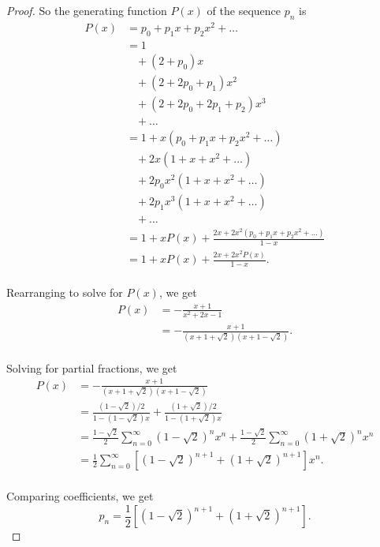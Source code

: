 \documentclass{article}
\begin{document}
\begin{enumerate}[label={\bf Q\arabic*:}]
\begin{proof}
      So the generating function $P(x)$ of the sequence $p_n$ is
      \begin{align*}
        P(x) &=p_0 +p_1x +p_2x^2+\ldots\\
          &=1\\
          &\;\;\;+(2+p_0)x\\
          &\;\;\;+(2+2p_0+p_1)x^2\\
          &\;\;\;+(2+2p_0+2p_1+p_2)x^3\\
          &\;\;\;+\ldots\\
        &=1+x(p_0+p_1x+p_2x^2+\ldots)\\
          &\;\;\;+2x(1+x+x^2+\ldots)\\
          &\;\;\;+2p_0x^2(1+x+x^2+\ldots)\\
          &\;\;\;+2p_1x^3(1+x+x^2+\ldots)\\
          &\;\;\;+\ldots\\
        &=1+xP(x) +\frac{2x+2x^2(p_0+p_1x+p_2x^2+\ldots)}{1-x}\\
        &=1+xP(x) +\frac{2x+2x^2P(x)}{1-x}.\\
      \end{align*}

      Rearranging to solve for $P(x)$, we get
      \begin{align*}
        P(x) &=-\frac{x+1}{x^2+2x-1}\\
        &=-\frac{x+1}{(x+1+\sqrt{2})(x+1-\sqrt{2})}.\\
      \end{align*}

      Solving for partial fractions, we get
      \begin{align*}
        P(x) &=-\frac{x+1}{(x+1+\sqrt{2})(x+1-\sqrt{2})}\\
        &=\frac{(1-\sqrt{2})/2}{1-(1-\sqrt{2})x}
          +\frac{(1+\sqrt{2})/2}{1-(1+\sqrt{2})x}\\
        &=\frac{1-\sqrt{2}}{2} \sum_{n=0}^\infty
          \left(1-\sqrt{2}\right)^nx^n +\frac{1-\sqrt{2}}{2}
          \sum_{n=0}^\infty \left(1+\sqrt{2}\right)^nx^n\\
        &=\frac{1}{2} \sum_{n=0}^\infty \left[\left(1-\sqrt{2}\right)^{n+1}
        +\left(1+\sqrt{2}\right)^{n+1}\right] x^n.\\
      \end{align*}

      Comparing coefficients, we get
      \[p_n =\frac{1}{2} \left[\left(1-\sqrt{2}\right)^{n+1}
        +\left(1+\sqrt{2}\right)^{n+1}\right].\]
    \end{proof}
\end{enumerate}
\end{document}
